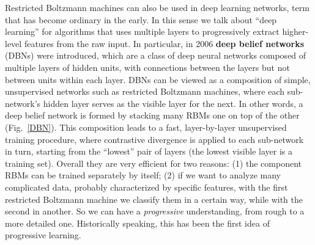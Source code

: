 Restricted Boltzmann machines can also be used in deep learning networks, term that has become ordinary in the early. In this sense we talk about ``deep learning'' for algorithms that uses multiple layers to progressively extract higher-level features from the raw input. In particular, in 2006 \textbf{deep belief networks} (DBNs) were introduced, which are a class of deep neural networks composed of multiple layers of hidden units, with connections between the layers but not between units within each layer. DBNs can be viewed as a composition of simple, unsupervised networks such as restricted Boltzmann machines, where each sub-network's hidden layer serves as the visible layer for the next. In other words, a deep belief network is formed by stacking many RBMs one on top of the other (Fig.~\ref{DBN}). This composition leads to a fast, layer-by-layer unsupervised training procedure, where contrastive divergence is applied to each sub-network in turn, starting from the ``lowest'' pair of layers (the lowest visible layer is a training set). Overall they are very efficient for two reasons: (1) the component RBMs can be trained separately by itself; (2) if we want to analyze many complicated data, probably characterized by specific features, with the first restricted Boltzmann machine we classify them in a certain way, while with the second in another. So we can have a \emph{progressive} understanding, from rough to a more detailed one. Historically speaking, this has been the first idea of progressive learning.
